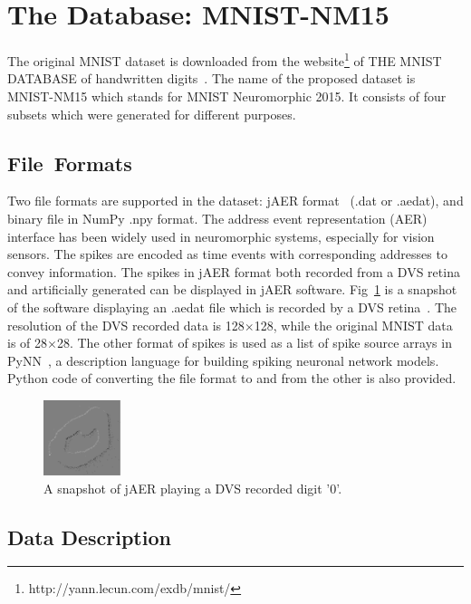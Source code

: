 \section{The Database: MNIST-NM15}
\label{sec:data}
The original MNIST dataset is downloaded from the website\footnote{http://yann.lecun.com/exdb/mnist/} of THE MNIST DATABASE of handwritten digits~\cite{lecun_gradient-based_1998}.
The name of the proposed dataset is MNIST-NM15 which stands for MNIST Neuromorphic 2015.
It consists of four subsets which were generated for different purposes.
\subsection{File~Formats}

Two file formats are supported in the dataset: jAER format~\cite{delbruck2008frame} (.dat or .aedat), and binary file in NumPy .npy format.
The  address event representation (AER) interface has been widely used in neuromorphic systems, especially for vision sensors.
The spikes are encoded as time events with corresponding addresses to convey information.
The spikes in jAER format both recorded from a DVS retina and artificially generated can be displayed in jAER software.
Fig~\ref{Fig:jaer} is a snapshot of the software displaying an .aedat file which is recorded by a DVS retina~\cite{serrano-gotarredona_128_2013}.
The resolution of the DVS recorded data is 128$\times$128, while the original MNIST data is of 28$\times$28.
The other format of spikes is used as a list of spike source arrays in PyNN~\cite{davison2008pynn}, a description language for building spiking neuronal network models.
Python code of converting the file format to and from the other is also provided.
\begin{figure}[hbt!]
	\centering
	\includegraphics[width=0.2\textwidth]{images/dvs-128.pdf}
	\caption{A snapshot of jAER playing a DVS recorded digit '0'.}
	\label{Fig:jaer}
\end{figure}  



\subsection{Data Description}	
